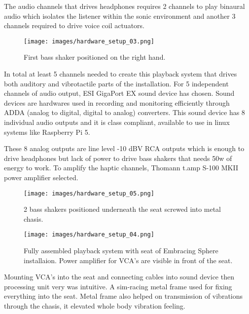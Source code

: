         The audio channels that drives headphones requires 2 channels to play binaural audio which isolates the listener within the sonic environment and another 3 channels required to drive voice coil actuators.\par

        \begin{figure}[H]
            \centering
            \texttt{[image: images/hardware\_setup\_03.png]}
            \caption{First bass shaker positioned on the right hand.}
            \label{fig:HARD_SETUP_03}
        \end{figure}  

        In total at least 5 channels needed to create this playback system that drives both auditory and vibrotactile parts of the installation. For 5 independent channels of audio output, ESI GigaPort EX sound device has chosen. Sound devices are hardwares used in recording and monitoring efficiently through ADDA (analog to digital, digital to analog) converters\cite{Sound_Reinforcement}. This sound device has 8 individual audio outputs and it is class compliant, available to use in linux systems like Raspberry Pi 5.\par

        These 8 analog outputs are line level -10 dBV RCA outputs which is enough to drive headphones but lack of power to drive bass shakers that needs 50w of energy to work. To amplify the haptic channels, Thomann t.amp S-100 MKII power amplifier selected.\par

        \begin{figure}[H]
            \centering
            \texttt{[image: images/hardware\_setup\_05.png]}
            \caption{2 bass shakers positioned underneath the seat screwed into metal chasis.}
            \label{fig:HARD_SETUP_04}
        \end{figure} 

        \begin{figure}[H]
            \centering
            \texttt{[image: images/hardware\_setup\_04.png]}
            \caption{Fully assembled playback system with seat of Embracing Sphere installaion. Power amplifier for VCA's are visible in front of the seat.}
            \label{fig:HARD_SETUP_05}
        \end{figure}

        Mounting VCA's into the seat and connecting cables into sound device then processing unit  very was intuitive. A sim-racing metal frame used for fixing everything into the seat. Metal frame also helped on transmission of vibrations through the chasis, it elevated whole body vibration feeling.\par

